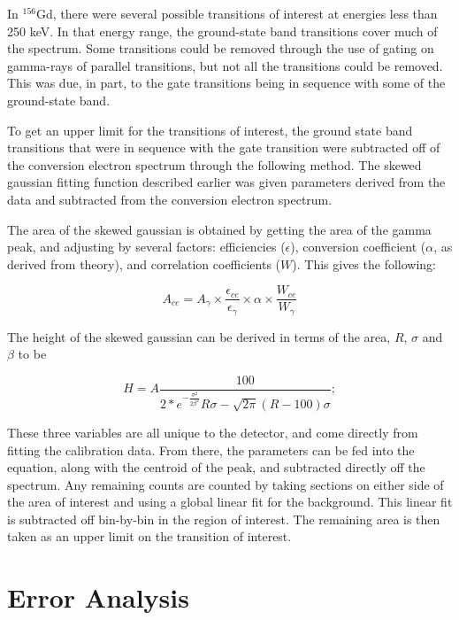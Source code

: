 In $^{156}$Gd, there were several possible transitions of interest at energies less than 250 keV. In that energy range, the ground-state band transitions cover much of the spectrum. Some transitions could be removed through the use of gating on gamma-rays of parallel transitions, but not all the transitions could be removed. This was due, in part, to the gate transitions being in sequence with some of the ground-state band. 

To get an upper limit for the transitions of interest, the ground state band transitions that were in sequence with the gate transition were subtracted off of the conversion electron spectrum through the following method. The skewed gaussian fitting function described earlier was given parameters derived from the data and subtracted from the conversion electron spectrum.

The area of the skewed gaussian is obtained by getting the area of the gamma peak, and adjusting by several factors: efficiencies ($\epsilon$), conversion coefficient ($\alpha$, as derived from theory), and correlation coefficients ($W$). This gives the following:

\begin{equation}
    A_{ce} = A_{\gamma}\times\frac{\epsilon_{ce}}{\epsilon_{\gamma}}\times\alpha\times\frac{W_{ce}}{W_{\gamma}}
    \label{eq:subt_area_skew}
\end{equation}

The height of the skewed gaussian can be derived in terms of the area, $R$, $\sigma$ and $\beta$ to be

\begin{equation}
    H = A\frac{100}{2*e^{-\frac{\sigma^2}{2\beta^2}}R\sigma-\sqrt{2\pi}(R-100)\sigma};
    \label{eq:subt_height_skew}
\end{equation}

These three variables are all unique to the detector, and come directly from fitting the calibration data. From there, the parameters can be fed into the equation, along with the centroid of the peak, and subtracted directly off the spectrum. Any remaining counts are counted by taking sections on either side of the area of interest and using a global linear fit for the background. This linear fit is subtracted off bin-by-bin in the region of interest. The remaining area is then taken as an upper limit on the transition of interest.

\section{Error Analysis}
